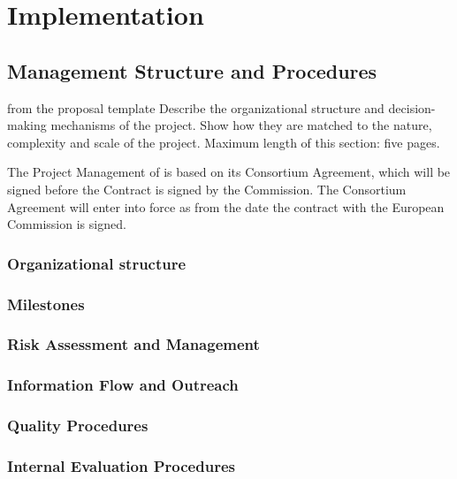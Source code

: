 \chapter{Implementation}\label{chap:implementation}

\section{Management Structure and Procedures}\label{chap:management}
\begin{todo}{from the proposal template}
  Describe the organizational structure and decision-making mechanisms
  of the project. Show how they are matched to the nature, complexity
  and scale of the project.  Maximum length of this section: five pages.
\end{todo}

The Project Management of {\pn} is based on its Consortium Agreement, which will be
signed before the Contract is signed by the Commission. The Consortium Agreement will
enter into force as from the date the contract with the European Commission is signed.
\subsection{Organizational structure}\label{sec:management-structure}
\subsection{Milestones}\label{sec:milestones}
\milestonetable
\subsection{Risk Assessment and Management}
\subsection{Information Flow and Outreach}\label{sec:spread-excellence}
\subsection{Quality Procedures}\label{sec:quality-management}
\subsection{Internal Evaluation Procedures}
\newpage

